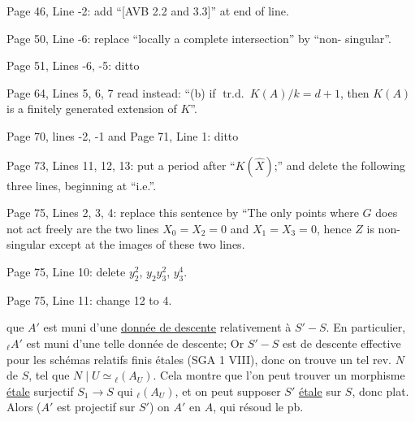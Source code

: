 Page 46, Line -2: add ``[AVB 2.2 and 3.3]'' at end of line.

Page 50, Line -6: replace ``locally a complete intersection'' by ``non-
singular''.

Page 51, Lines -6, -5: ditto

Page 64, Lines 5, 6, 7 read instead: ``(b) if $\operatorname{tr.d.}\ K(A)/k=d+1$, then $K(A)$ is a finitely generated extension of $K$''.

Page 70, lines -2, -1 and Page 71, Line 1: ditto

Page 73, Lines 11, 12, 13: put a period after ``$K(\hat X)$;'' and delete the following three lines, beginning at ``i.e.''.

Page 75, Lines 2, 3, 4: replace this sentence by ``The only points where $G$ does not act freely are the two lines $X_0=X_2=0$ and $X_1=X_3=0$, hence $Z$ is non-singular except at the images of these two lines.

Page 75, Line 10: delete $y_2^2$, $y_2y_3^2$, $y_3^4$.

Page 75, Line 11: change 12 to 4.

que $A'$ est muni d'une \uline{donnée de descente} relativement à $S'\mathbin{-}S$. En particulier, \deleted{$\unsure{\ell}$} ${}_\ell A'$ est muni d'une telle donnée de descente;   Or $S'\mathbin{-}S$ est  de descente effective pour les schémas relatifs finis étales (SGA 1 VIII), donc on trouve un  tel rev.   $N$ de $S$, tel que $N\mid U\simeq{}_{\ell}(A_U)$. Cela montre que l'on peut trouver un morphisme  \uline{étale} surjectif $S_1\to S$ qui  ${}_\ell(A_U)$,  et on peut supposer $S'$  \uline{étale} sur $S$, donc plat. Alors ($A'$ est projectif sur $S'$) on   $A'$ en $A$, qui résoud le pb.

